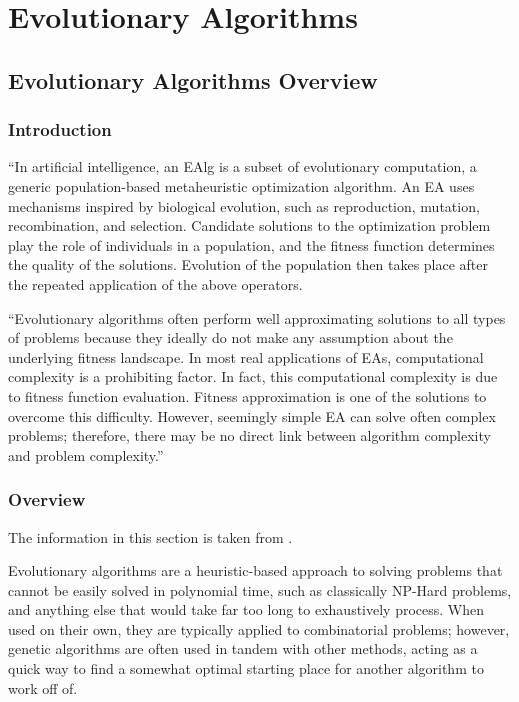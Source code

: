 

\part{Evolutionary Algorithms}

\chapter{Evolutionary Algorithms Overview}
\label{chap:EvolAlgoOverview}


\section{Introduction}

``In artificial intelligence, an \ac{EAlg} is a subset of evolutionary computation, a generic population-based metaheuristic optimization algorithm. An EA uses mechanisms inspired by biological evolution, such as reproduction, mutation, recombination, and selection. Candidate solutions to the optimization problem play the role of individuals in a population, and the fitness function determines the quality of the solutions. Evolution of the population then takes place after the repeated application of the above operators.

``Evolutionary algorithms often perform well approximating solutions to all types of problems because they ideally do not make any assumption about the underlying fitness landscape.  In most real applications of EAs, computational complexity is a prohibiting factor. In fact, this computational complexity is due to fitness function evaluation. Fitness approximation is one of the solutions to overcome this difficulty. However, seemingly simple EA can solve often complex problems; therefore, there may be no direct link between algorithm complexity and problem complexity.''\cite{WikipeadiaEvolutionaryAlgo2019}

\section{Overview}

The information in this section is taken from \cite{DevinSoni2018}.

Evolutionary algorithms are a heuristic-based approach to solving problems that cannot be easily solved in polynomial time, such as classically NP-Hard problems, and anything else that would take far too long to exhaustively process. When used on their own, they are typically applied to combinatorial problems; however, genetic algorithms are often used in tandem with other methods, acting as a quick way to find a somewhat optimal starting place for another algorithm to work off of.

